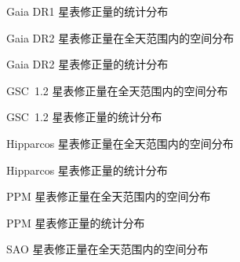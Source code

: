 \documentclass{aastex701}
\begin{document}
\begin{figure}[ht!]
\caption{Gaia DR1 星表修正量的统计分布}
\label{fig:hist_gaiadr1}
\end{figure}

\begin{figure}[ht!]
\caption{Gaia DR2 星表修正量在全天范围内的空间分布}
\label{fig:bias_gaiadr2_2x2}
\end{figure}

\begin{figure}[ht!]
\caption{Gaia DR2 星表修正量的统计分布}
\label{fig:hist_gaiadr2}
\end{figure}

\begin{figure}[ht!]
\caption{GSC~1.2 星表修正量在全天范围内的空间分布}
\label{fig:bias_gsc1.2_2x2}
\end{figure}

\begin{figure}[ht!]
\caption{GSC~1.2 星表修正量的统计分布}
\label{fig:hist_gsc1.2}
\end{figure}

\begin{figure}[ht!]
\caption{Hipparcos 星表修正量在全天范围内的空间分布}
\label{fig:bias_hipparcos_2x2}
\end{figure}

\begin{figure}[ht!]
\caption{Hipparcos 星表修正量的统计分布}
\label{fig:hist_hipparcos}
\end{figure}

\begin{figure}[ht!]
\caption{PPM 星表修正量在全天范围内的空间分布}
\label{fig:bias_ppm_2x2}
\end{figure}

\begin{figure}[ht!]
\caption{PPM 星表修正量的统计分布}
\label{fig:hist_ppm}
\end{figure}

\begin{figure}[ht!]
\caption{SAO 星表修正量在全天范围内的空间分布}
\label{fig:bias_sao_2x2}
\end{figure}
\end{document}
